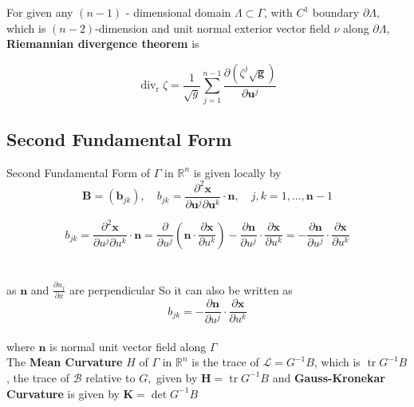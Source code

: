 \documentclass[oneside]{book}
\begin{document}
    
    
    
      For given any $(n-1)$ - dimensional domain $\Lambda \subset \Gamma$,  with $C^{1}$ boundary $\partial \Lambda,$ which is $(n-2)$-dimension and unit normal exterior vector field $\nu$ along $\partial \Lambda$, \textbf{Riemannian divergence theorem} is 
      
        \begin{equation}
        \label{eq20}  
      \operatorname{div}_{\mathrm{r}} \zeta=\frac{1}{\sqrt{g}} \sum_{j=1}^{n-1} \frac{\partial\left(\zeta^{j} \sqrt{\boldsymbol{g}}\right)}{\partial \boldsymbol{u}^{j}}
        \end{equation}
      
      
      \subsection{Second Fundamental Form}
      \label{ss:14} Second Fundamental Form of $\Gamma$ in $\mathbb{R}^{n}$ is given locally by 
        \begin{equation}
        \label{eq21}  
      \boldsymbol{B}=\left(\boldsymbol{b}_{j k}\right), \quad b_{j k}=\frac{\partial^{2} \mathbf{x}}{\partial \boldsymbol{u}^{j} \partial \boldsymbol{u}^{k}} \cdot \mathbf{n}, \quad j, k=1, \ldots, \boldsymbol{n}-1 
        \end{equation}
      
      $$b_{j k}=\frac{\partial^{2} \mathbf{x}}{\partial u^{j} \partial u^{k}} \cdot \mathbf{n}=\frac{\partial}{\partial u^{j}}\left(\mathbf{n} \cdot \frac{\partial \mathbf{x}}{\partial u^{k}}\right)-\frac{\partial \mathbf{n}}{\partial u^{j}} \cdot \frac{\partial \mathbf{x}}{\partial u^{k}}=-\frac{\partial \mathbf{n}}{\partial u^{j}} \cdot \frac{\partial \mathbf{x}}{\partial u^{k}}$$ \\\\
      
      
       as $\boldsymbol{n}$ and $\frac{\partial u_{j}}{\partial x} $ are perpendicular
      So it can also be written as 
        \begin{equation}
        \label{eq22}  
       b_{j k} = -\frac{\partial \mathbf{n}}{\partial u^{j}} \cdot \frac{\partial \mathbf{x}}{\partial u^{k}}         \end{equation} \\
       where $\mathbf{n}$ is normal unit vector field along $\Gamma$ \\

      
      The \textbf{Mean Curvature} $H$ of $\Gamma$ in $\mathbb{R}^{n}$ is the trace of $\mathcal{L} = G^{-1} B$, which is $\operatorname{tr} G^{-1} B$, the trace of $\mathcal{B}$ relative
to $G,$ given by
$
\boldsymbol{H}=\operatorname{tr} G^{-1} B
$ and \textbf{Gauss-Kronekar Curvature} is given by $\boldsymbol{K}=\operatorname{det} {G}^{-1} {B}$
\end{document}
